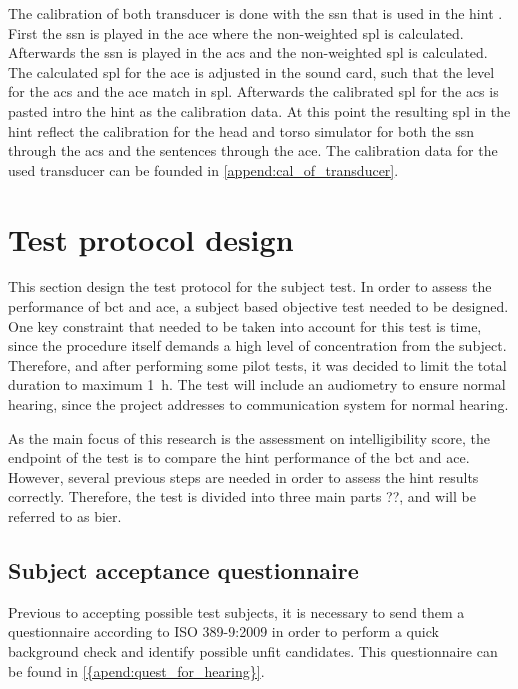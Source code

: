 The calibration of both transducer is done with the \gls{ssn} that is used in the \gls{hint} \citep{nilsson_95}. First the \gls{ssn} is played in the \gls{ace} where the non-weighted \gls{spl} is calculated. Afterwards the \gls{ssn} is played in the \gls{acs} and the non-weighted \gls{spl} is calculated. The calculated \gls{spl} for the \gls{ace} is adjusted in the sound card, such that the level for the \gls{acs} and the \gls{ace} match in \gls{spl}. Afterwards the calibrated \gls{spl} for the \gls{acs} is pasted intro the \gls{hint} as the calibration data. At this point the resulting \gls{spl}  in the \gls{hint} reflect the calibration for the head and torso simulator for both the \gls{ssn} through the \gls{acs} and the sentences through the \gls{ace}. The calibration data for the used transducer can be founded in \autoref{append:cal_of_transducer}.
   
   
   
\section{Test protocol design}
\label{sec:test_protocol_design}   
This section design the test protocol for the subject test. In order to assess the performance of \gls{bct} and \gls{ace}, a subject based objective test needed to be designed. One key constraint that needed to be taken into account for this test is time, since the procedure itself demands a high level of concentration from the subject. Therefore, and after performing some pilot tests, it was decided to limit the total duration to maximum \SI{1}{\hour}. The test will include an audiometry to ensure normal hearing, since the project addresses to communication system for normal hearing.
 
As the main focus of this research is the assessment on intelligibility score, the endpoint of the test is to compare the \gls{hint} performance of the \gls{bct} and \gls{ace}. However, several previous steps are needed in order to assess the \gls{hint} results correctly. Therefore, the test is divided into three main parts ??, and will be referred to as \gls{bier}. 
 
 
 
 \subsection{Subject acceptance questionnaire}
Previous to accepting possible test subjects, it is necessary to send them a questionnaire according to ISO 389-9:2009 \citep{iso_389-9} in order to perform a quick background check and identify possible unfit candidates. This questionnaire can be found in \autoref{{apend:quest_for_hearing}}.
  
